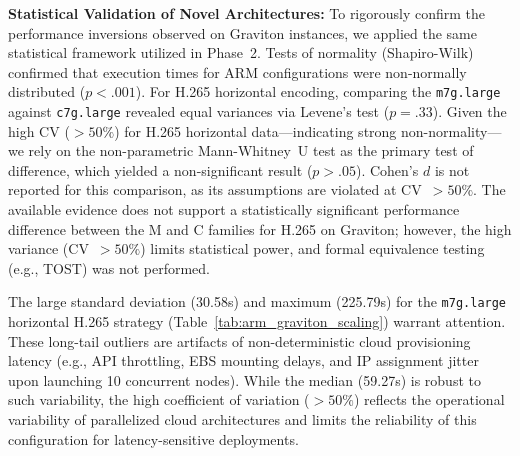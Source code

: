 \documentclass[conference]{IEEEtran}
\begin{document}
\textbf{Statistical Validation of Novel Architectures:} To rigorously confirm the performance inversions observed on Graviton instances, we applied the same statistical framework utilized in Phase~2. Tests of normality (Shapiro-Wilk) confirmed that execution times for ARM configurations were non-normally distributed ($p < .001$). For H.265 horizontal encoding, comparing the \texttt{m7g.large} against \texttt{c7g.large} revealed equal variances via Levene's test ($p = .33$). Given the high CV ($>50\%$) for H.265 horizontal data---indicating strong non-normality---we rely on the non-parametric Mann-Whitney~U test as the primary test of difference, which yielded a non-significant result ($p > .05$). Cohen's $d$ is not reported for this comparison, as its assumptions are violated at CV~$>50\%$. The available evidence does not support a statistically significant performance difference between the M and C families for H.265 on Graviton; however, the high variance (CV~$>50\%$) limits statistical power, and formal equivalence testing (e.g., TOST) was not performed.

The large standard deviation (30.58s) and maximum (225.79s) for the \texttt{m7g.large} horizontal H.265 strategy (Table~\ref{tab:arm_graviton_scaling}) warrant attention. These long-tail outliers are artifacts of non-deterministic cloud provisioning latency (e.g., API throttling, EBS mounting delays, and IP assignment jitter upon launching 10 concurrent nodes). While the median (59.27s) is robust to such variability, the high coefficient of variation ($>50\%$) reflects the operational variability of parallelized cloud architectures and limits the reliability of this configuration for latency-sensitive deployments.
\end{document}
